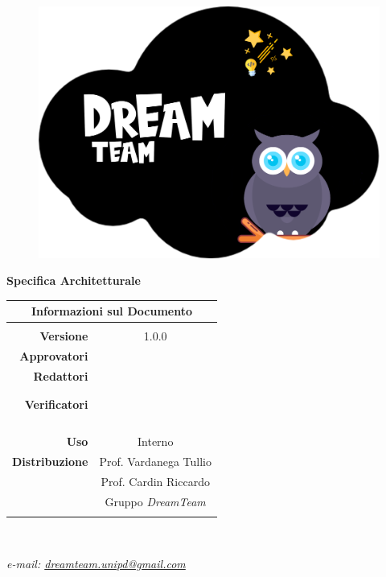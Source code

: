 
\begin{center}

\begin{figure}
\centering
\includegraphics[scale=0.05]{Contenuto/Immagini/DreamTeam.png} 
\end{figure}

{\Huge{\textbf{Specifica Architetturale}}} \\ [1cm]
\begin{table}[htbp]
\centering
\begin{tabular}{r|c}
\multicolumn{2}{c}{\textbf{Informazioni sul Documento}} \\
\hline \\
\textbf{Versione} & 1.0.0 \\ \rule{0pt}{3ex}    
\textbf{Approvatori} &  \\ \rule{0pt}{3ex}      
\textbf{Redattori} & \FP{} \\ \rule{0pt}{2ex}   
& \GC{} \\ \rule{0pt}{2ex} 
& \MB{} \\ \rule{0pt}{3ex} 
\textbf{Verificatori} & \MG{} \\ \rule{0pt}{2ex}   
&  \\ \rule{0pt}{2ex}   
&  \\ \rule{0pt}{2ex}
&  \\ \rule{0pt}{2ex} 
&  \\ \rule{0pt}{3ex}        
\textbf{Uso} & Interno \\ \rule{0pt}{3ex}    
\textbf{Distribuzione} & Prof. Vardanega Tullio \\ \rule{0pt}{2ex}   
& Prof. Cardin Riccardo \\ \rule{0pt}{2ex}   
& Gruppo \textit{DreamTeam} \\ \rule{0pt}{0.1cm}   
\end{tabular} \\ [0.5cm]
\end{table}

\textsl{ e-mail: \href{mailto:dreamteam.unipd@gmail.com}{dreamteam.unipd@gmail.com} } \\[2cm]
\end{center}
\pagebreak